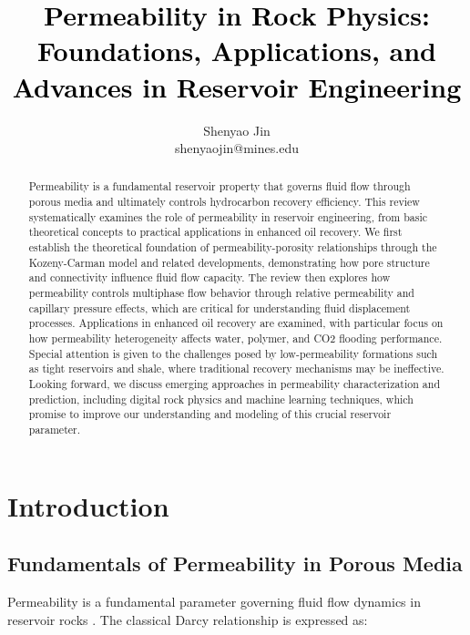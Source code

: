 \documentclass[journal]{IEEEtran}
\begin{document}
\title{\textcolor{black}{Permeability in Rock Physics: Foundations, Applications, and Advances in Reservoir Engineering}}      

\author{Shenyao Jin\\shenyaojin@mines.edu} 

\maketitle

\begin{abstract}
    Permeability is a fundamental reservoir property that governs fluid flow through porous media and ultimately controls hydrocarbon recovery efficiency. This review systematically examines the role of permeability in reservoir engineering, from basic theoretical concepts to practical applications in enhanced oil recovery. We first establish the theoretical foundation of permeability-porosity relationships through the Kozeny-Carman model and related developments, demonstrating how pore structure and connectivity influence fluid flow capacity. The review then explores how permeability controls multiphase flow behavior through relative permeability and capillary pressure effects, which are critical for understanding fluid displacement processes. Applications in enhanced oil recovery are examined, with particular focus on how permeability heterogeneity affects water, polymer, and CO2 flooding performance. Special attention is given to the challenges posed by low-permeability formations such as tight reservoirs and shale, where traditional recovery mechanisms may be ineffective. Looking forward, we discuss emerging approaches in permeability characterization and prediction, including digital rock physics and machine learning techniques, which promise to improve our understanding and modeling of this crucial reservoir parameter.
\end{abstract}

\section{Introduction}

\subsection{Fundamentals of Permeability in Porous Media}

Permeability is a fundamental parameter governing fluid flow dynamics in reservoir rocks \parencite{corsano_low_nodate}. The classical Darcy relationship is expressed as:
\end{document}
